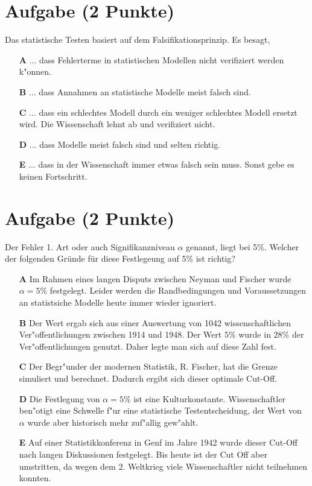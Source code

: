 \documentclass[a4paper, 9pt]{scrartcl}\usepackage[]{graphicx}\usepackage[]{xcolor}
\begin{document}
\section{Aufgabe \hfill (2 Punkte)}



Das statistische Testen basiert auf dem Falsifikationsprinzip. Es besagt,



\begin{enumerate}
\item [\textbf{A} \msquare] ... dass Fehlerterme in statistischen Modellen nicht verifiziert werden k{"o}nnen.
\item [\textbf{B} \msquare] ... dass Annahmen an statistische Modelle meist falsch sind.
\item [\textbf{C} \msquare] ... dass ein schlechtes Modell durch ein weniger schlechtes Modell ersetzt wird. Die Wissenschaft lehnt ab und verifiziert nicht.
\item [\textbf{D} \msquare] ... dass Modelle meist falsch sind und selten richtig.
\item [\textbf{E} \msquare] ... dass in der Wissenschaft immer etwas falsch sein muss. Sonst gebe es keinen Fortschritt.
\end{enumerate}

\section{Aufgabe \hfill (2 Punkte)}

Der Fehler 1. Art oder auch Signifikanzniveau $\alpha$ genannt, liegt bei
5\%. Welcher der folgenden Gr{\"u}nde f{\"u}r diese Festlegeung auf 5\% ist richtig?



\begin{enumerate}
\item [\textbf{A} \msquare] Im Rahmen eines langen Disputs zwischen Neyman und Fischer wurde $\alpha = 5\%$ festgelegt. Leider werden die Randbedingungen und Voraussetzungen an statistsiche Modelle heute immer wieder ignoriert.
\item [\textbf{B} \msquare] Der Wert ergab sich aus einer Auswertung von 1042 wissenschaftlichen Ver{"o}ffentlichungen zwischen 1914 und 1948. Der Wert $5\%$ wurde in $28\%$ der Ver{"o}ffentlichungen genutzt. Daher legte man sich auf diese Zahl fest.
\item [\textbf{C} \msquare] Der Begr{"u}nder der modernen Statistik, R. Fischer, hat die Grenze simuliert und berechnet. Dadurch ergibt sich dieser optimale Cut-Off.
\item [\textbf{D} \msquare] Die Festlegung von $\alpha = 5\%$ ist eine Kulturkonstante. Wissenschaftler ben{"o}tigt eine Schwelle f{"u}r eine statistische Testentscheidung, der Wert von $\alpha$ wurde aber historisch mehr zuf{"a}llig gew{"a}hlt.
\item [\textbf{E} \msquare] Auf einer Statistikkonferenz in Genf im Jahre 1942 wurde dieser Cut-Off nach langen Diskussionen festgelegt. Bis heute ist der Cut Off aber umstritten, da wegen dem 2. Weltkrieg viele Wissenschaftler nicht teilnehmen konnten.
\end{enumerate}
\end{document}
